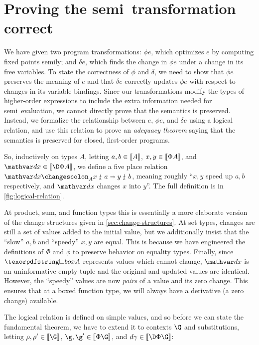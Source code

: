 \section{Proving the semi\naive\ transformation correct}

We have given two program transformations: $\phi e$, which optimizes $e$ by
computing fixed points semi\naive{}ly; and $\delta e$, which finds the change in
$\phi e$ under a change in its free variables.
%
To state the correctness of $\phi$ and $\delta$, we need to show that $\phi e$
preserves the meaning of $e$ and that $\delta e$ correctly updates $\phi e$ with
respect to changes in its variable bindings.
%
Since our transformations modify the types of higher-order expressions to
include the extra information needed for semi\naive\ evaluation, we cannot
directly prove that the semantics is preserved.
%
Instead, we formalize the relationship between $e$, $\phi e$, and $\delta e$
using a logical relation, and use this relation to prove an \emph{adequacy
  theorem} saying that the semantics is preserved for closed, first-order
programs.



So, inductively on types $A$, letting $a,b \in \llbracket{A}\rrbracket$, $x,y \in \llbracket{\Phi A}\rrbracket$,
and $\dx \in \den{\DP A}$, we define a five place relation
$\weirdat{A}{\dx}{x}{a}{y}{b}$, meaning roughly ``$x,y$ speed up $a,b$
respectively, and $\dx$ changes $x$ into $y$''. The full definition is in
\cref{fig:logical-relation}.

At product, sum, and function types this is essentially a more elaborate version
of the change structures given in \cref{sec:change-structures}.
%
At set types, changes are still a set of values added to the initial value, but
we additionally insist that the ``slow'' $a,b$ and ``speedy'' $x,y$ are equal.
%
This is because we have engineered the definitions of $\Phi$ and $\phi$ to
preserve behavior on equality types.
%
Finally, since $\iso A$ represents values which cannot change, $\dx$ is an
uninformative empty tuple and the original and updated values are identical.
%
However, the ``speedy'' values are now \emph{pairs} of a value and its zero
change.
%
This ensures that at a boxed function type, we will always have a derivative (a
zero change) available.

The logical relation is defined on simple values, and so before we can state the
fundamental theorem, we have to extend it to contexts $\G$ and substitutions,
letting $\rho,\rho' \in \den{\G}$, $\g,\g' \in \den{\Phi\G}$, and $\dgamma \in
\den{\DP\G}$:

